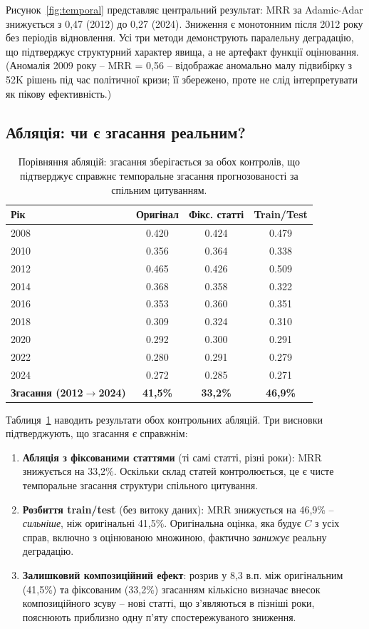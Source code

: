 Рисунок~\ref{fig:temporal} представляє центральний результат: MRR за Adamic-Adar знижується з 0,47 (2012) до 0,27 (2024).
Зниження є монотонним після 2012 року без періодів відновлення.
Усі три методи демонструють паралельну деградацію, що підтверджує структурний характер явища, а не артефакт функції оцінювання.
(Аномалія 2009 року -- MRR = 0,56 -- відображає аномально малу підвибірку з 52K рішень під час політичної кризи; її збережено, проте не слід інтерпретувати як пікову ефективність.)

\subsection{Абляція: чи є згасання реальним?}

\begin{table}[t]
\centering
\small
\caption{Порівняння абляцій: згасання зберігається за обох контролів, що підтверджує справжнє темпоральне згасання прогнозованості за спільним цитуванням.}
\label{tab:ablation}
\begin{tabular}{@{}l ccc@{}}
\toprule
\textbf{Рік} & \textbf{Оригінал} & \textbf{Фікс. статті} & \textbf{Train/Test} \\
\midrule
2008 & 0.420 & 0.424 & 0.479 \\
2010 & 0.356 & 0.364 & 0.338 \\
2012 & 0.465 & 0.426 & 0.509 \\
2014 & 0.368 & 0.358 & 0.322 \\
2016 & 0.353 & 0.360 & 0.351 \\
2018 & 0.309 & 0.324 & 0.310 \\
2020 & 0.292 & 0.300 & 0.291 \\
2022 & 0.280 & 0.291 & 0.279 \\
2024 & 0.272 & 0.285 & 0.271 \\
\midrule
\textbf{Згасання (2012$\to$2024)} & \textbf{41,5\%} & \textbf{33,2\%} & \textbf{46,9\%} \\
\bottomrule
\end{tabular}
\end{table}

Таблиця~\ref{tab:ablation} наводить результати обох контрольних абляцій.
Три висновки підтверджують, що згасання є справжнім:

\begin{enumerate}[nosep,leftmargin=*]
  \item \textbf{Абляція з фіксованими статтями} (ті самі статті, різні роки): MRR знижується на 33,2\%. Оскільки склад статей контролюється, це є чисте темпоральне згасання структури спільного цитування.
  \item \textbf{Розбиття train/test} (без витоку даних): MRR знижується на 46,9\% -- \emph{сильніше}, ніж оригінальні 41,5\%. Оригінальна оцінка, яка будує $C$ з усіх справ, включно з оцінюваною множиною, фактично \emph{занижує} реальну деградацію.
  \item \textbf{Залишковий композиційний ефект}: розрив у 8,3 в.п. між оригінальним (41,5\%) та фіксованим (33,2\%) згасанням кількісно визначає внесок композиційного зсуву -- нові статті, що з'являються в пізніші роки, пояснюють приблизно одну п'яту спостережуваного зниження.
\end{enumerate}
